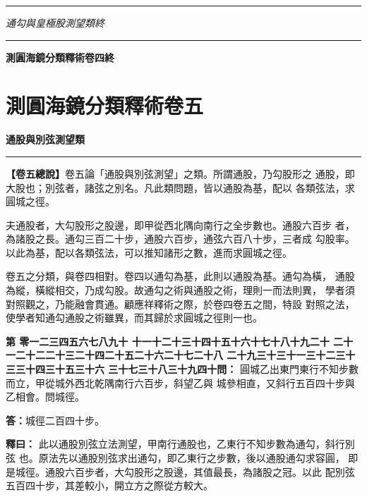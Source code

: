 \documentclass[11pt,a4paper]{article}
\newcommand{\longline}{\noindent\rule{\textwidth}{0.4pt}}
\newcounter{probnum}
\newcommand{\chnum}[1]{%
  \ifcase#1 零\or 一\or 二\or 三\or 四\or 五\or 六\or 七\or 八\or 九\or 十\or
    十一\or 十二\or 十三\or 十四\or 十五\or 十六\or 十七\or 十八\or 十九\or 二十\or
    二十一\or 二十二\or 二十三\or 二十四\or 二十五\or 二十六\or 二十七\or 二十八\or
    二十九\or 三十\or 三十一\or 三十二\or 三十三\or 三十四\or 三十五\or 三十六\or
    三十七\or 三十八\or 三十九\or 四十\fi}
\newcommand{\problem}[1]{\stepcounter{probnum}\par\noindent\textbf{第\chnum{\value{probnum}}問：}#1\par}
\newcommand{\answer}[1]{\par\noindent\textbf{答：}#1\par}
\newcommand{\shiyi}[1]{\par\noindent\textbf{釋曰：}#1\par}
\begin{document}
\vspace{0.5cm}
\longline
\begin{center}
\textit{通勾與皇極股測望類終}
\end{center}

\vspace{0.5cm}
\longline
\begin{center}
{\Large\bfseries\color{volcolor} 測圓海鏡分類釋術卷四終}
\end{center}

\newpage

\section{測圓海鏡分類釋術卷五}
\label{sec:vol5}

\begin{center}
{\Large\bfseries\color{volcolor} 通股與別弦測望類}
\end{center}

\vspace{0.3cm}
\longline
\vspace{0.3cm}

\noindent
\textbf{【卷五總說】}卷五論「通股與別弦測望」之類。所謂通股，乃勾股形之
通股，即大股也；別弦者，諸弦之別名。凡此類問題，皆以通股為基，配以
各類弦法，求圓城之徑。

夫通股者，大勾股形之股邊，即甲從西北隅向南行之全步數也。通股六百步
者，為諸股之長。通勾三百二十步，通股六百步，通弦六百八十步，三者成
勾股率。以此為基，配以各類弦法，可以推知諸形之數，進而求圓城之徑。

卷五之分類，與卷四相對。卷四以通勾為基，此則以通股為基。通勾為橫，
通股為縱，橫縱相交，乃成勾股。故通勾之術與通股之術，理則一而法則異，
學者須對照觀之，乃能融會貫通。顧應祥釋術之際，於卷四卷五之間，特設
對照之法，使學者知通勾通股之術雖異，而其歸於求圓城之徑則一也。

\vspace{0.3cm}

\setcounter{probnum}{0}

\problem{
圓城乙出東門東行不知步數而立，甲從城外西北乾隅南行六百步，斜望乙與
城參相直，又斜行五百四十步與乙相會。問城徑。
}

\answer{城徑二百四十步。}

\shiyi{
此以通股別弦立法測望，甲南行通股也，乙東行不知步數為通勾，斜行別弦
也。原法先以通股別弦求出通勾，即乙東行之步數，後以通股通勾求容圓，
即是城徑。通股六百步者，大勾股形之股邊，其值最長，為諸股之冠。以此
配別弦五百四十步，其差較小，開立方之際從方較大。
}
\end{document}
